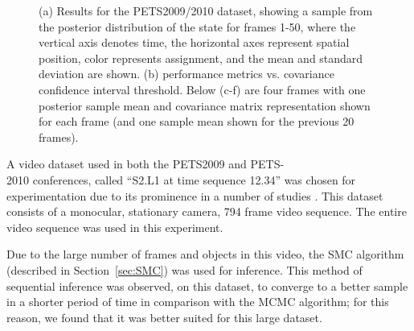 \documentclass{article}
\begin{document}
\begin{figure}[!]
   \hspace{1pt}
  \caption{ (a) Results for the PETS2009/2010 dataset, showing a sample from the posterior distribution of the state for frames 1-50, where the vertical axis denotes time, the horizontal axes represent spatial position, color represents assignment, and the mean and standard deviation are shown. (b) performance metrics vs. covariance confidence interval threshold. Below (c-f) are four frames with one posterior sample mean and covariance matrix representation shown for each frame (and one sample mean shown for the previous 20 frames).}
  \label{fig:pets2009_results}
\end{figure}

A video dataset used in both the PETS2009 and PETS-\\2010 conferences, called ``S2.L1 at time sequence 12.34'' was chosen for experimentation due to its prominence in a number of studies \cite{ellis_2010,arsic2009multi,berclaz2009multiple,conte2010performance,bolme2009simple,breitenstein2009markovian,ge2009evaluation,alahi2009sparsity,yang2009probabilistic}. This dataset consists of a monocular, stationary camera, 794 frame video sequence. The entire video sequence was used in this experiment. 

Due to the large number of frames and objects in this video, the SMC algorithm (described in Section~\ref{sec:SMC}) was used for inference. This method of sequential inference was observed, on this dataset, to converge to a better sample in a shorter period of time in comparison with the MCMC algorithm; for this reason, we found that it was better suited for this large dataset.
\end{document}

